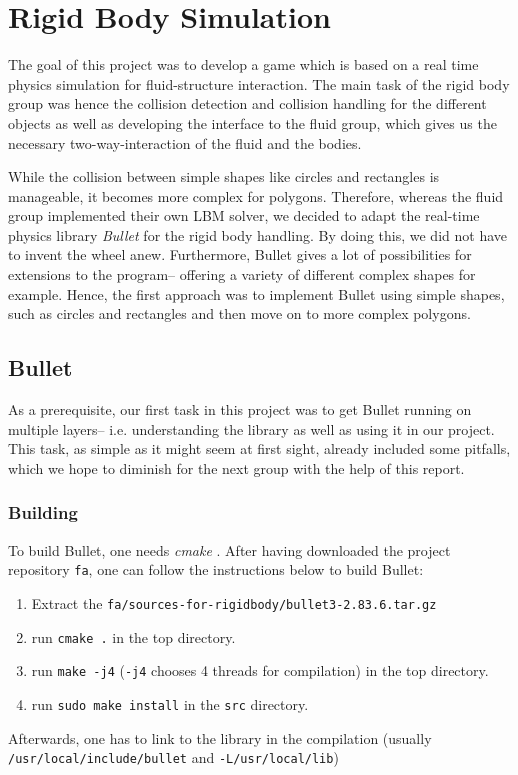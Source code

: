 \section{Rigid Body Simulation}
The goal of this project was to develop a game which is based on a real time physics simulation for fluid-structure interaction. The main task of the rigid body group was hence the collision detection and collision handling for the different objects as well as developing the interface to the fluid group, which gives us the necessary two-way-interaction of the fluid and the bodies. 

While the collision between simple shapes like circles and rectangles is manageable, it becomes more complex for polygons. Therefore, whereas the fluid group implemented their own LBM solver, we decided to adapt the real-time physics library \emph{Bullet} \cite{Bullet} for the rigid body handling. By doing this, we did not have to invent the wheel anew. Furthermore, Bullet gives a lot of possibilities for extensions to the program-- offering a variety of different complex shapes for example. Hence, the first approach was to implement Bullet using simple shapes, such as circles and rectangles and then move on to more complex polygons.

\subsection{Bullet}
As a prerequisite, our first task in this project was to get Bullet running on multiple layers-- i.e. understanding the library as well as using it in our project. This task, as simple as it might seem at first sight, already included some pitfalls, which we hope to diminish for the next group with the help of this report. 
\subsubsection{Building}
To build Bullet, one needs \emph{cmake} \cite{CMake}. After having downloaded the project repository \verb+fa+, one can follow the instructions below to build Bullet:
\begin{enumerate}
\item Extract the \verb+fa/sources-for-rigidbody/bullet3-2.83.6.tar.gz+
\item run \verb+cmake .+ in the top directory.
\item run \verb+make -j4+ (\verb+-j4+ chooses 4 threads for compilation) in the top directory.
\item run \verb+sudo make install+ in the \verb+src+ directory.
\end{enumerate}
Afterwards, one has to link to the library in the compilation (usually \verb+/usr/local/include/bullet+ and \verb+-L/usr/local/lib+)
